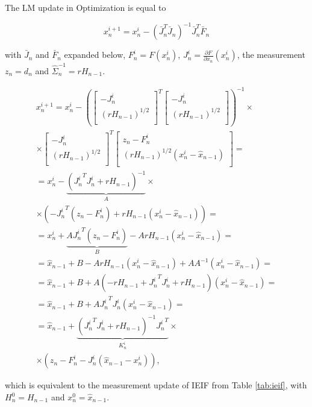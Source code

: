 \documentclass[10pt,twocolumn,letterpaper]{article}
\begin{document}
 The LM update in Optimization \label{eq:kalman-like} is equal to 
 
 \begin{equation}
 x_n^{i + 1}= x_n^{i} - (\bar{J}_n^T \bar{J}_n)^{-1} \bar{J}_n^T \bar{F}_n 
\end{equation}
 
 with $\bar{J}_n$ and $\bar{F}_n$ expanded below, $F_n^i = F(x_n^i)$, 
 $J_n^i = \frac{\partial F}{\partial x_n}(x_n^i)$, the measurement $z_n = d_n$ and $\hat{\Sigma}_n^{-1} = r H_{n - 1}$.
 
 \begin{align*}
x_n^{i + 1}= x_n^{i} - \left(
\left[
	\begin{array}{cc}
		- J_n^i \\
		\left(r H_{n - 1}\right)^{1/2} \\
	\end{array}
\right]^T 
\left[
	\begin{array}{c}
		- J_n^i \\
		\left(r H_{n - 1}\right)^{1/2} \\
	\end{array}
\right]
\right)^{-1} \times\\
\times \left[
	\begin{array}{cc}
		- J_n^i \\
		\left(r H_{n - 1}\right)^{1/2} \\
	\end{array}
\right]^T 
\left[
	\begin{array}{c}
		z_n - F_n^i \\
		\left(r H_{n - 1}\right)^{1/2}(x_n^i - \hat{x}_{n - 1}) \\
	\end{array}
\right] = \\
= x_n^{i} - \underbrace{\left({J_n^i}^T J_n^i + r H_{n - 1}\right)^{-1}}_{A} \times \\
\times \left( - {J_n^i}^T(z_n - F_n^i) + r H_{n - 1}(x_n^i - \hat{x}_{n - 1})\right)  = \\
= x_n^i +\underbrace{A {J_n^i}^T(z_n - F_n^i)}_B - A r H_{n - 1}(x_n^i - \hat{x}_{n - 1})  = \\
= \hat{x}_{n - 1} + B  - A r H_{n - 1}(x_n^i - \hat{x}_{n - 1}) + A A^{-1}( x_n^i - \hat{x}_{n - 1}) = \\
= \hat{x}_{n - 1} + B + A(- r H_{n - 1} + {J_n^i}^T J_n^i + r H_{n - 1})(x_n^i - \hat{x}_{n - 1}) = \\
= \hat{x}_{n - 1} + B + A {J_n^i}^T J_n^i (x_n^i - \hat{x}_{n - 1}) = \\
= \hat{x}_{n - 1} + \underbrace{\left({J_n^i}^T J_n^i + r H_{n - 1}\right)^{-1} {J_n^i}^T}_{K_n^i} \times \\
\times (z_n - F_n^i - J_n^i (\hat{x}_{n - 1} - x_n^i)),
 \end{align*}
 
 which is equivalent to the measurement update of IEIF from Table \ref{tab:ieif}, with $H_n^0 = H_{n-1}$ and $x_n^0 = \hat{x}_{n - 1}$.

{\small


}
\end{document}
